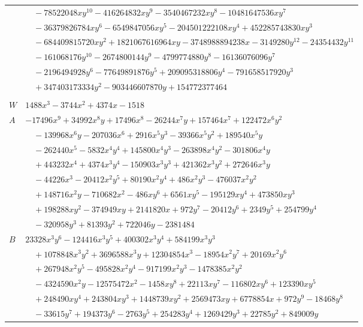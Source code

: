 \documentclass[11pt]{article}
\begin{document}
\begin{longtable}{@{}ll@{}}
 & $\quad -78522048xy^{10}-416264832xy^{9}-3540467232xy^{8}-10481647536xy^{7}$\\
 & $\quad -36379826784xy^{6}-6549847056xy^{5}-204501222108xy^{4}+452285743830xy^{3}$\\
 & $\quad -684409815720xy^{2}+1821067616964xy-3748988894238x-3149280y^{12}-24354432y^{11}$\\
 & $\quad -161068176y^{10}-2674800144y^{9}-4799774880y^{8}-16136076096y^{7}$\\
 & $\quad -2196494928y^{6}-77649891876y^{5}+209095318806y^{4}-791658517920y^{3}$\\
 & $\quad +347403173334y^{2}-903446607870y+154772377464$\\
\addlinespace[3pt]
\multicolumn{2}{@{}l}{$i=6$, $m=81$, neighbours $112,17,33,52,53,58,69,77$}\\
$W$ & $1488x^{3}-3744x^{2}+4374x-1518$\\
$A$ & $-17496x^{9}+34992x^{8}y+17496x^{8}-26244x^{7}y+157464x^{7}+122472x^{6}y^{2}$\\
 & $\quad -139968x^{6}y-207036x^{6}+2916x^{5}y^{3}-39366x^{5}y^{2}+189540x^{5}y$\\
 & $\quad -262440x^{5}-5832x^{4}y^{4}+145800x^{4}y^{3}-263898x^{4}y^{2}-301806x^{4}y$\\
 & $\quad +443232x^{4}+4374x^{3}y^{4}-150903x^{3}y^{3}+421362x^{3}y^{2}+272646x^{3}y$\\
 & $\quad -44226x^{3}-20412x^{2}y^{5}+80190x^{2}y^{4}+486x^{2}y^{3}-476037x^{2}y^{2}$\\
 & $\quad +148716x^{2}y-710682x^{2}-486xy^{6}+6561xy^{5}-195129xy^{4}+473850xy^{3}$\\
 & $\quad +198288xy^{2}-374949xy+2141820x+972y^{7}-20412y^{6}+2349y^{5}+254799y^{4}$\\
 & $\quad -320958y^{3}+81393y^{2}+722046y-2381484$\\
$B$ & $23328x^{3}y^{6}-124416x^{3}y^{5}+400302x^{3}y^{4}+584199x^{3}y^{3}$\\
 & $\quad +1078848x^{3}y^{2}+3696588x^{3}y+12304854x^{3}-18954x^{2}y^{7}+20169x^{2}y^{6}$\\
 & $\quad +267948x^{2}y^{5}-495828x^{2}y^{4}-917199x^{2}y^{3}-1478385x^{2}y^{2}$\\
 & $\quad -4324590x^{2}y-12575472x^{2}-1458xy^{8}+22113xy^{7}-116802xy^{6}+123390xy^{5}$\\
 & $\quad +248490xy^{4}+243804xy^{3}+1448739xy^{2}+2569473xy+6778854x+972y^{9}-18468y^{8}$\\
 & $\quad -33615y^{7}+194373y^{6}-2763y^{5}+254283y^{4}+1269429y^{3}+22785y^{2}+849009y$\\

\end{longtable}
\end{document}
